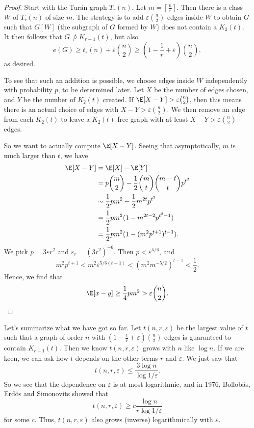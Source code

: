 \documentclass[a4paper]{article}
\begin{document}
\begin{proof}
  Start with the Tur\'an graph $T_r(n)$. Let $m = \left\lceil \frac{n}{r} \right\rceil$. Then there is a class $W$ of $T_r(n)$ of size $m$. The strategy is to add $\varepsilon \binom{n}{2}$ edges inside $W$ to obtain $G$ such that $G[W]$ (the subgraph of $G$ formed by $W$) does not contain a $K_2(t)$. It then follows that $G \not\supseteq K_{r + 1}(t)$, but also
  \[
    e(G) \geq t_r(n) + \varepsilon \binom{n}{2} \geq \left(1 - \frac{1}{r} +\varepsilon \right) \binom{n}{2},
  \]
  as desired.

  To see that such an addition is possible, we choose edges inside $W$ independently with probability $p$, to be determined later. Let $X$ be the number of edges chosen, and $Y$ be the number of $K_2(t)$ created. If $\E[X - Y] > \varepsilon \binom{n}{2}$, then this means there is an actual choice of edges with $X - Y > \varepsilon \binom{n}{2}$. We then remove an edge from each $K_2(t)$ to leave a $K_2(t)$-free graph with at least $X - Y > \varepsilon \binom{n}{2}$ edges.

  So we want to actually compute $\E[X - Y]$. Seeing that asymptotically, $m$ is much larger than $t$, we have
  \begin{align*}
    \E[X - Y] &= \E[X] - \E[Y] \\
    &= p\binom{m}{2} - \frac{1}{2}\binom{m}{t} \binom{m - t}{t} p^{t^2}\\
    &\sim \frac{1}{2} pm^2 - \frac{1}{2} m^{2t} p^{t^2}\\
    &= \frac{1}{2} pm^2 (1 - m^{2t - 2} p^{t^2 - 1})\\
    &= \frac{1}{2} pm^2 (1 - (m^2 p^{t + 1})^{t - 1}).
  \end{align*}
  We pick $p = 3 \varepsilon r^2$ and $\varepsilon_r = (3r^2)^{-6}$. Then $p < \varepsilon^{5/6}$, and
  \[
    m^2 p^{t + 1} < m^2 \varepsilon^{5/6 (t + 1)} < (m^2 m^{-5/2})^{t - 1} < \frac{1}{2}. %
  \]
  Hence, we find that
  \[
    \E[x - y] \geq \frac{1}{4} p m^2 > \varepsilon \binom{n}{2}.\qedhere
  \]
\end{proof}

Let's summarize what we have got so far. Let $t(n, r, \varepsilon)$ be the largest value of $t$ such that a graph of order $n$ with $\left(1 - \frac{1}{r} + \varepsilon \right) \binom{n}{2}$ edges is guaranteed to contain $K_{r + 1}(t)$. Then we know $t(n, r, \varepsilon)$ grows with $n$ like $\log n$. If we are keen, we can ask how $t$ depends on the other terms $r$ and $\varepsilon$. We just saw that
\[
  t(n, r, \varepsilon) \leq \frac{3 \log n}{\log 1/\varepsilon}.
\]
So we see that the dependence on $\varepsilon$ is at most logarithmic, and in 1976, Bollob\'as, Erd\"os and Simonovits showed that
\[
  t(n, r, \varepsilon) \geq c \frac{\log n}{r \log 1/\varepsilon}
\]
for some $c$. Thus, $t(n, r, \varepsilon)$ also grows (inverse) logarithmically with $\varepsilon$.
\end{document}
